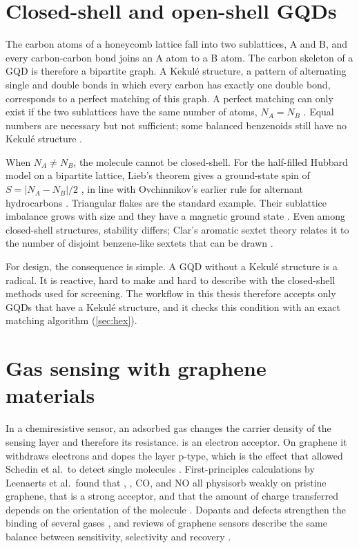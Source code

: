 \section{Closed-shell and open-shell GQDs}
\label{sec:lit-shell}

The carbon atoms of a honeycomb lattice fall into two sublattices, A and B, and every
carbon-carbon bond joins an A atom to a B atom. The carbon skeleton of a GQD is therefore a
bipartite graph. A Kekul\'e structure, a pattern of alternating single and double bonds in which
every carbon has exactly one double bond, corresponds to a perfect matching of this graph. A perfect
matching can only exist if the two sublattices have the same number of atoms, \(N_A = N_B\)
\cite{cyvin1988kekule}. Equal numbers are necessary but not sufficient; some balanced benzenoids
still have no Kekul\'e structure \cite{cyvin1988kekule}.

When \(N_A \neq N_B\), the molecule cannot be closed-shell. For the half-filled Hubbard model on a
bipartite lattice, Lieb's theorem gives a ground-state spin of \(S = |N_A - N_B|/2\)
\cite{lieb1989}, in line with Ovchinnikov's earlier rule for alternant hydrocarbons
\cite{ovchinnikov1978}. Triangular flakes are the standard example. Their sublattice imbalance
grows with size and they have a magnetic ground state
\cite{fernandezrossier2007,wang2009topological}. Even among closed-shell structures, stability
differs; Clar's aromatic sextet theory relates it to the number of disjoint benzene-like sextets
that can be drawn \cite{clar1972sextet}.

For design, the consequence is simple. A GQD without a Kekul\'e structure is a radical. It is
reactive, hard to make and hard to describe with the closed-shell methods used for screening. The
workflow in this thesis therefore accepts only GQDs that have a Kekul\'e structure, and it checks
this condition with an exact matching algorithm (\cref{sec:hex}).

\section{Gas sensing with graphene materials}
\label{sec:lit-sensing}

In a chemiresistive sensor, an adsorbed gas changes the carrier density of the sensing layer and
therefore its resistance.  is an electron acceptor. On graphene it withdraws electrons and
dopes the layer p-type, which is the effect that allowed Schedin et al.\ to detect single
molecules \cite{schedin2007detection}. First-principles calculations by Leenaerts et al.\ found that
, , CO,  and NO all physisorb weakly on pristine graphene, that 
is a strong acceptor, and that the amount of charge transferred depends on the orientation of the
molecule \cite{leenaerts2008adsorption}. Dopants and defects strengthen the binding of several
gases \cite{zhang2009dopants}, and reviews of graphene sensors describe the same balance between
sensitivity, selectivity and recovery \cite{yuan2013graphene}.

